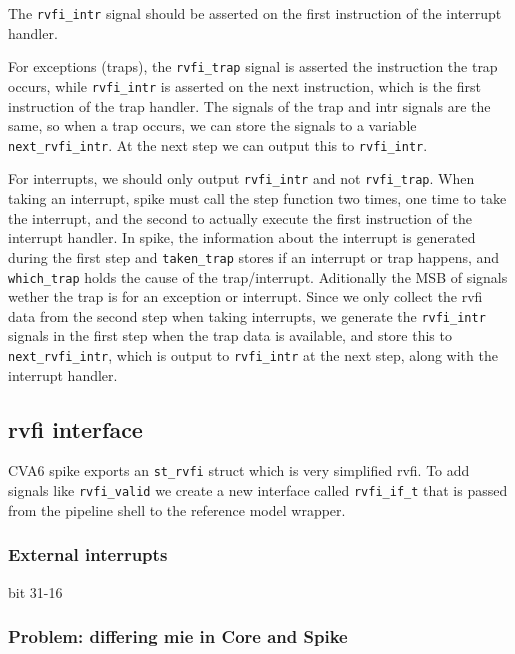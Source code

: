 The \lstinline{rvfi_intr} signal should be asserted on the first instruction of the interrupt handler. 

For exceptions (traps), the \lstinline{rvfi_trap} signal is asserted the instruction the trap occurs, while \lstinline{rvfi_intr} is asserted on the next instruction, which is the first instruction of the trap handler. The signals of the trap and intr signals are the same, so when a trap occurs, we can store the signals to a variable \lstinline{next_rvfi_intr}. At the next step we can output this to \lstinline{rvfi_intr}.

For interrupts, we should only output \lstinline{rvfi_intr} and not \lstinline{rvfi_trap}. When taking an interrupt, spike must call the step function two times, one time to take the interrupt, and the second to actually execute the first instruction of the interrupt handler. In spike, the information about the interrupt is generated during the first step and \lstinline{taken_trap} stores if an interrupt or trap happens, and \lstinline{which_trap} holds the cause of the trap/interrupt. Aditionally the MSB of signals wether the trap is for an exception or interrupt. Since we only collect the rvfi data from the second step when taking interrupts, we generate the \lstinline{rvfi_intr} signals in the first step when the trap data is available, and store this to \lstinline{next_rvfi_intr}, which is output to \lstinline{rvfi_intr} at the next step, along with the interrupt handler.



\subsection{rvfi interface}

CVA6 spike exports an \lstinline{st_rvfi} struct which is very simplified rvfi. To add signals like \lstinline{rvfi_valid} we create a new interface called \lstinline{rvfi_if_t} that is passed from the pipeline shell to the reference model wrapper. 

\subsubsection{External interrupts}

bit 31-16


\subsubsection{Problem: differing mie in Core and Spike}

